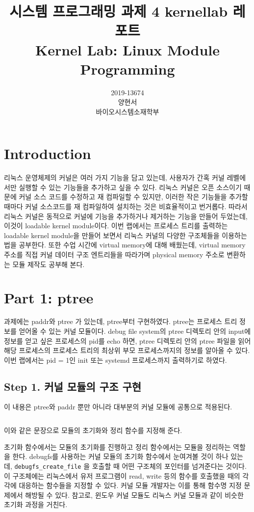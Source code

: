 \documentclass{report}
\title{시스템 프로그래밍 과제 4 kernellab 레포트 \\
\large Kernel Lab: Linux Module Programming}
\date{}
\author{
  2019-13674\\
  양현서 \\
  바이오시스템소재학부\\
}
\begin{document}
\maketitle
\tableofcontents

\section{Introduction}
\paragraph{}
 리눅스 운영체제의 커널은 여러 가지 기능을 담고 있는데, 사용자가 간혹 커널 레벨에서만 실행할 수 있는 기능들을 추가하고 싶을 수 있다. 리눅스 커널은 오픈 소스이기 때문에 커널 소스 코드를 수정하고 재 컴파일할 수 있지만, 이러한 작은 기능들을 추가할 때마다 커널 소스코드를 재 컴파일하여 설치하는 것은 비효율적이고 번거롭다. 따라서 리눅스 커널은 동적으로 커널에 기능을 추가하거나 제거하는 기능을 만들어 두었는데, 이것이 loadable kernel module이다. 이번 랩에서는 프로세스 트리를 출력하는 loadable kernel module을 만들어 보면서 리눅스 커널의 다양한 구조체들을 이용하는 법을 공부한다. 또한 수업 시간에 virtual memory에 대해 배웠는데, virtual memory 주소를 직접 커널 데이터 구조 엔트리들을 따라가며 physical memory 주소로 변환하는 모듈 제작도 공부해 본다. 

\section{Part 1: ptree}
과제에는 paddr와 ptree 가 있는데, ptree부터 구현하였다. ptree는 프로세스 트리 정보를 얻어올 수 있는 커널 모듈이다. debug file system의 ptree 디렉토리 안의 input에 정보를 얻고 싶은 프로세스의 pid를 echo 하면, ptree 디렉토리 안의 ptree 파일을 읽어 해당 프로세스의 프로세스 트리의 최상위 부모 프로세스까지의 정보를 알아올 수 있다. 이번 랩에서는 pid = 1인 init 또는 systemd 프로세스까지 출력하기로 하였다.
\subsection{Step 1. 커널 모듈의 구조 구현}
이 내용은 ptree와 paddr 뿐만 아니라 대부분의 커널 모듈에 공통으로 적용된다. 
\inputminted[firstline=170,lastline=171, linenos, breaklines]{C}{../kernellab-handout-done/ptree/dbfs_ptree.c}
이와 같은 문장으로 모듈의 초기화와 정리 함수를 지정해 준다.

초기화 함수에서는 모듈의 초기화를 진행하고 정리 함수에서는 모듈을 정리하는 역할을 한다. debugfs를 사용하는 커널 모듈의 초기화 함수에서 눈여겨볼 것이 하나 있는데, \lstinline{debugfs_create_file} 을 호출할 때 어떤 구조체의 포인터를 넘겨준다는 것이다. 이 구조체에는 리눅스에서 유저 프로그램이 read, write 등의 함수를 호출했을 때의 각각에 대응하는 함수들을 지정할 수 있다. 커널 모듈 개발자는 이를 통해 함수명 지정 문제에서 해방될 수 있다. 참고로, 윈도우 커널 모듈도 리눅스 커널 모듈과 같이 비슷한 초기화 과정을 거친다.
\end{document}
